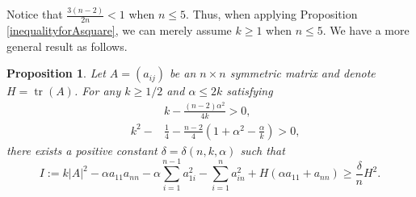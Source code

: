 \documentclass[11pt,letterpaper]{amsart}
\DeclareMathOperator{\tr}{tr}
\newtheorem{proposition}[theorem]{Proposition}
\theoremstyle{definition}
\theoremstyle{remark}
\numberwithin{equation}{section}
\begin{document}
Notice that $\frac{3(n-2)}{2n}< 1$ when $n\leq 5$.  Thus, when applying Proposition \ref{inequalityforAsquare}, we can merely assume $k\geq 1$ when $n\leq 5.$ We have a more general result as follows.

\begin{proposition}\label{inequalityforAsquare1}
Let $A=(a_{ij})$ be an $n\times n$ symmetric matrix and denote $H=\tr(A)$. For any $k\geq 1/2$ and $\alpha\leq 2k$ satisfying
\begin{equation}\label{assumptions}
\begin{split}
     &k-\frac{(n-2)\alpha^2}{4k}>0,\\
        \quad k^2-&\frac{1}{4}-\frac{n-2}{4}\left(1+\alpha^2-\frac{\alpha}{k}\right)>0,
\end{split}
\end{equation}
there exists a positive constant $\delta=\delta(n,k,\alpha)$ such that \[I:=k|A|^2-\alpha a_{11}a_{nn}-\alpha\sum_{i=1}^{n-1}a_{1i}^2-\sum_{i=1}^na_{in}^2+H(\alpha a_{11}+a_{nn})\geq \frac{\delta}{n}H^2.\]

\end{proposition}
\end{document}
